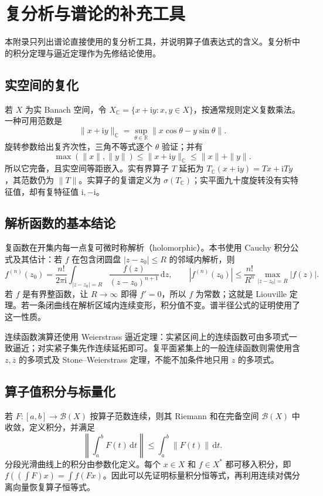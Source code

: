 \setcounter{chapter}{2} %
\chapter{复分析与谱论的补充工具}
\label{app:fa-complex}

本附录只列出谱论直接使用的复分析工具，并说明算子值表达式的含义。复分析中的积分定理与逼近定理作为先修结论使用。

\section{实空间的复化}
若 $X$ 为实 Banach 空间，令 $X_{\mathbb C}=\{x+\mathrm iy:x,y\in X\}$，按通常规则定义复数乘法。一种可用范数是
\[
 \|x+\mathrm iy\|_{\mathbb C}=
 \sup_{\theta\in\mathbb R}\|x\cos\theta-y\sin\theta\|.
\]
旋转参数给出复齐次性，三角不等式逐个 $\theta$ 验证；并有
\[
 \max(\|x\|,\|y\|)\leq\|x+\mathrm iy\|_{\mathbb C}\leq\|x\|+\|y\|.
\]
所以它完备，且实空间等距嵌入。实有界算子 $T$ 延拓为 $T_{\mathbb C}(x+\mathrm iy)=Tx+\mathrm iTy$，其范数仍为 $\|T\|$。实算子的复谱定义为 $\sigma(T_{\mathbb C})$；实平面九十度旋转没有实特征值，却有复特征值 $\mathrm i,-\mathrm i$。

\section{解析函数的基本结论}
复函数在开集内每一点复可微时称解析（holomorphic）。本书使用 Cauchy 积分公式及其估计：若 $f$ 在包含闭圆盘 $|z-z_0|\leq R$ 的邻域内解析，则
\[
 f^{(n)}(z_0)=\frac{n!}{2\pi\mathrm i}
 \int_{|z-z_0|=R}\frac{f(z)}{(z-z_0)^{n+1}}\,\mathrm dz,
 \qquad |f^{(n)}(z_0)|\leq\frac{n!}{R^n}\max_{|z-z_0|=R}|f(z)|.
\]
若 $f$ 是有界整函数，让 $R\to\infty$ 即得 $f'=0$，所以 $f$ 为常数；这就是 Liouville 定理。若一条闭曲线在解析区域内连续变形，积分值不变。谱半径公式的证明使用了这一性质。

连续函数演算还使用 Weierstrass 逼近定理：实紧区间上的连续函数可由多项式一致逼近；对实紧子集先作连续延拓即可。复平面紧集上的一般连续函数则需使用含 $z,\overline z$ 的多项式及 Stone--Weierstrass 定理，不能不加条件地只用 $z$ 的多项式。

\section{算子值积分与标量化}
若 $F:[a,b]\to\mathcal B(X)$ 按算子范数连续，则其 Riemann 和在完备空间 $\mathcal B(X)$ 中收敛，定义积分，并满足
\[
 \left\|\int_a^bF(t)\,\mathrm dt\right\|\leq\int_a^b\|F(t)\|\,\mathrm dt.
\]
分段光滑曲线上的积分由参数化定义。每个 $x\in X$ 和 $f\in X^*$ 都可移入积分，即 $f((\int F)x)=\int f(Fx)$。因此可以先证明标量积分恒等式，再利用连续对偶分离向量恢复算子恒等式。

